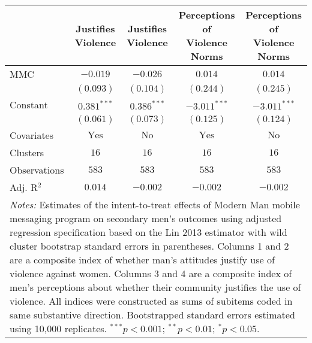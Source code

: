 
\begin{tabular}{l c c c c}
\toprule
 & Justifies Violence & Justifies Violence & \shortstack{Perceptions of \\ Violence Norms} & \shortstack{Perceptions of \\ Violence Norms} \\
\midrule
MMC          & $-0.019$       & $-0.026$      & $0.014$        & $0.014$        \\
             & $(0.093)$      & $(0.104)$     & $(0.244)$      & $(0.245)$      \\
Constant     & $0.381^{***}$  & $0.386^{***}$ & $-3.011^{***}$ & $-3.011^{***}$ \\
             & $(0.061)$      & $(0.073)$     & $(0.125)$      & $(0.124)$      \\
\midrule
Covariates   & $\textrm{Yes}$ & $\textrm{No}$ & $\textrm{Yes}$ & $\textrm{No}$  \\
Clusters     & $16$           & $16$          & $16$           & $16$           \\
Observations & $583$          & $583$         & $583$          & $583$          \\
Adj. R$^2$   & $0.014$        & $-0.002$      & $-0.002$       & $-0.002$       \\
\bottomrule
\multicolumn{5}{l}{\scriptsize{\parbox{\linewidth}{\vspace{2pt}
       \textit{Notes:} Estimates of the intent-to-treat effects of Modern Man mobile
       messaging program on secondary men's outcomes using adjusted regression
       specification based on the Lin 2013 estimator with wild cluster bootstrap
       standard errors in parentheses. Columns 1 and 2 are a composite index of
       whether man's attitudes justify use of violence against women. Columns 3 and 4
       are a composite index of men's perceptions about whether their community justifies
       the use of violence. All indices were constructed as sums of subitems coded in
       same substantive direction. Bootstrapped standard errors estimated using 10,000 replicates. \\ $^{***}p<0.001$; $^{**}p<0.01$; $^{*}p<0.05$.}}}
\end{tabular}
